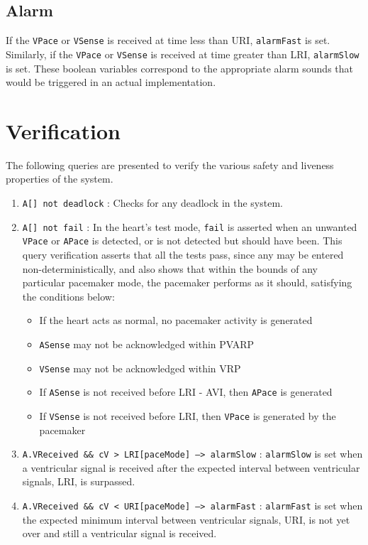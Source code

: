 \documentclass[a4paper]{article}
\begin{document}
\subsection{Alarm} If the {\tt VPace} or {\tt VSense} is received at time less than URI, {\tt alarmFast} is set.  Similarly, if  the {\tt VPace} or {\tt VSense} is received at time  greater than LRI, {\tt {\tt alarmSlow}} is set.  These boolean variables correspond to the appropriate alarm sounds that would be triggered in an actual implementation.

\section{Verification}
The following queries are presented to verify the various safety and liveness properties of the system.
\begin{enumerate}
\item {\tt A[] not deadlock} : Checks for any deadlock in the system.

\item {\tt A[] not fail} :  In the heart's test mode, {\tt fail} is asserted when an unwanted {\tt VPace} or {\tt APace} is detected, or is not detected but should have been.  This query verification asserts that all the tests pass, since any may be entered non-deterministically, and also shows that within the bounds of any particular pacemaker mode, the pacemaker performs as it should, satisfying the conditions below:
\begin{itemize}
\item If the heart acts as normal, no pacemaker activity is generated
\item {\tt ASense} may not be acknowledged within PVARP
\item {\tt VSense} may not be acknowledged within VRP
\item If {\tt ASense} is not received before LRI - AVI, then {\tt APace} is generated
\item If {\tt VSense} is not received before LRI, then {\tt VPace} is generated by the pacemaker
\end{itemize}

\item {\tt A.VReceived \&\& cV > LRI[paceMode] --> alarmSlow} : {\tt alarmSlow} is set when  a ventricular signal is received after the expected interval between ventricular signals, LRI, is surpassed.

\item {\tt A.VReceived \&\& cV < URI[paceMode] --> alarmFast} : {\tt alarmFast} is set when the expected  minimum interval between ventricular signals, URI, is not yet over and still a ventricular signal is received.


\end{enumerate}
\end{document}
